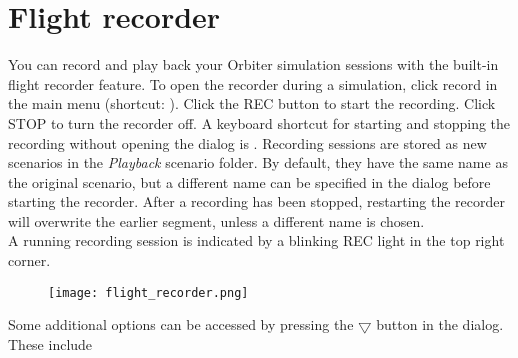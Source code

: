 \documentclass[Orbiter User Manual.tex]{subfiles}
\begin{document}
\section{Flight recorder}
\label{sec:flight_rec}
You can record and play back your Orbiter simulation sessions with the built-in flight recorder feature. To open the recorder during a simulation, click record in the main menu (shortcut: \Ctrl{}). Click the REC button to start the recording. Click STOP to turn the recorder off. A keyboard shortcut for starting and stopping the recording without opening the dialog is \Ctrl{}. Recording sessions are stored as new scenarios in the \textit{Playback} scenario folder. By default, they have the same name as the original scenario, but a different name can be specified in the dialog before starting the recorder. After a recording has been stopped, restarting the recorder will overwrite the earlier segment, unless a different name is chosen.\\
A running recording session is indicated by a blinking REC light in the top right corner.\\

\begin{figure}[H]
	\centering
	\texttt{[image: flight\_recorder.png]}
\end{figure}

\noindent
Some additional options can be accessed by pressing the $\bigtriangledown$ button in the dialog. These include
\end{document}
